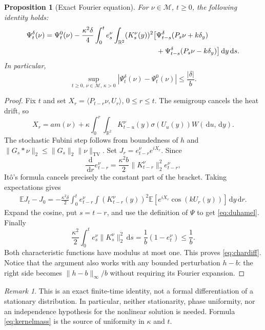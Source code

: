 \documentclass[11pt]{article}
\numberwithin{equation}{section}
\newtheorem{proposition}[theorem]{Proposition}
\theoremstyle{definition}
\theoremstyle{remark}
\newtheorem{remark}[theorem]{Remark}
\newcommand{\R}{\mathbb R}
\newcommand{\E}{\mathbb E}
\newcommand{\dd}{\,\mathrm d}
\newcommand{\TV}{\mathrm{TV}}
\begin{document}
\begin{proposition}[Exact Fourier equation]\label{prop:Duhamel}
For $\nu\in\mathcal M$, $t\ge0$, the following identity holds:
\begin{align}
 \Psi_t^\delta(\nu)=\Psi_t^0(\nu)
 -\frac{\kappa^2\delta}{4}\int_0^t e_s^\nu\int_{\R^2}(K_s^\nu(y))^2
 \big[&\Psi_{t-s}^\delta(P_s\nu+k\delta_y)\notag\\
 &+\Psi_{t-s}^\delta(P_s\nu-k\delta_y)\big]\dd y\dd s.\label{eq:duhamel}
\end{align}
In particular,
\begin{equation}\label{eq:chardiff}
 \sup_{t\ge0,\,\nu\in\mathcal M,\,\kappa>0}
 |\Psi_t^\delta(\nu)-\Psi_t^0(\nu)|\le\frac{|\delta|}{b}.
\end{equation}
\end{proposition}
\begin{proof}
Fix $t$ and set $X_r=\langle P_{t-r}\nu,U_r\rangle$, $0\le r\le t$. The semigroup cancels the heat drift, so
\[
 X_r=a m(\nu)+\kappa\int_0^r\int_{\R^2}K_{t-u}^\nu(y)\sigma(U_u(y))W(\dd u,\dd y).
\]
The stochastic Fubini step follows from boundedness of $h$ and $\|G_s*\nu\|_2\le\|G_s\|_2\|\nu\|_{\TV}$. Set $J_r=e_{t-r}^\nu e^{iX_r}$. Since
\[
 \frac{\dd}{\dd r}e_{t-r}^\nu=\frac{\kappa^2b}{2}\|K_{t-r}^\nu\|_2^2 e_{t-r}^\nu,
\]
It\^o's formula cancels precisely the constant part of the bracket. Taking expectations gives
\begin{align*}
 \E J_t-J_0=-\frac{\kappa^2\delta}{2}\int_0^t e_{t-r}^\nu\int (K_{t-r}^\nu(y))^2
 \E[e^{iX_r}\cos(kU_r(y))]\dd y\dd r.
\end{align*}
Expand the cosine, put $s=t-r$, and use the definition of $\Psi$ to get \eqref{eq:duhamel}. Finally
\begin{equation}\label{eq:kernelmass}
 \frac{\kappa^2}{2}\int_0^t e_s^\nu\|K_s^\nu\|_2^2\dd s
 =\frac1b(1-e_t^\nu)\le\frac1b.
\end{equation}
Both characteristic functions have modulus at most one. This proves \eqref{eq:chardiff}. Notice that the argument also works with any bounded perturbation $h-b$: the right side becomes $\|h-b\|_\infty/b$ without requiring its Fourier expansion.
\end{proof}
\begin{remark}
This is an exact finite-time identity, not a formal differentiation of a stationary distribution. In particular, neither stationarity, phase uniformity, nor an independence hypothesis for the nonlinear solution is needed. Formula \eqref{eq:kernelmass} is the source of uniformity in $\kappa$ and $t$.
\end{remark}
\end{document}
